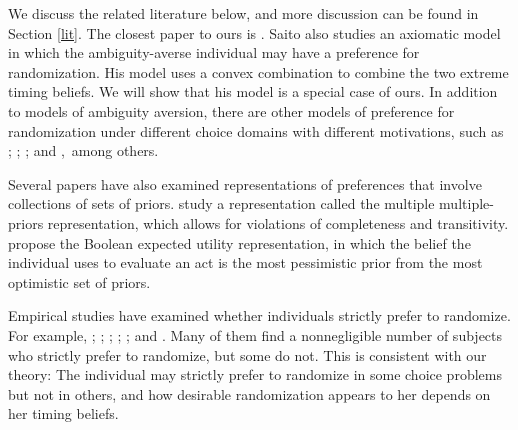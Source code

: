 \documentclass[12pt, notitlepage]{article}
\begin{document}

We discuss the related literature below, and more discussion can be found in
Section \ref{lit}. The closest paper to ours is \cite{Saito15}. Saito also
studies an axiomatic model in which the ambiguity-averse individual may have
a preference for randomization. His model uses a convex combination to
combine the two extreme timing beliefs. We will show that his model is a
special case of ours. In addition to models of ambiguity aversion, there are
other models of preference for randomization under different choice domains
with different motivations, such as \cite{Machina85}; \cite%
{Cerreia-VioglioDillenbergerOrtoleva15}; \cite{FudenbergIijimaStrzalecki15};
and \cite{Cerreia-VioglioDillenbergerOrtolevaEtAl19},\ among others.

Several papers have also examined representations of preferences that
involve collections of sets of priors. \cite{LehrerTeper11} study a
representation called the multiple multiple-priors representation, which
allows for violations of completeness and transitivity. \cite%
{FrickIijimaLeYaouanq19} propose the Boolean expected utility
representation, in which the belief the individual uses to evaluate an act
is the most pessimistic prior from the most optimistic set of priors.

Empirical studies have examined whether individuals strictly prefer to
randomize. For example, \cite{DominiakSchnedler11}; \cite{AgranovOrtoleva17}%
; \cite{DwengerKublerWeizsacker16}; \cite{OechsslerRauRoomets19}; \cite%
{ChewMiaoShenEtAl19}; and \cite{ZhangZhong19}. Many of them find a
nonnegligible number of subjects who strictly prefer to randomize, but some
do not. This is consistent with our theory: The individual may strictly
prefer to randomize in some choice problems but not in others, and how
desirable randomization appears to her depends on her timing beliefs.
\end{document}
